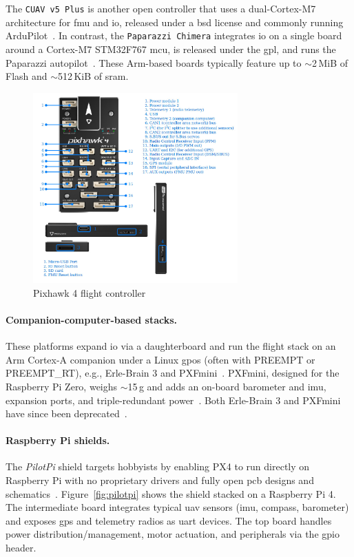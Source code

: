 The \lstinline|CUAV v5 Plus| is another open controller that uses a dual-Cortex-M7 architecture for \gls{fmu} and \gls{io}, released under a \gls{bsd} license and commonly running ArduPilot~\cite{arduPilot-cuavV5}. 
In contrast, the \lstinline|Paparazzi Chimera| integrates \gls{io} on a single board around a Cortex-M7 STM32F767 \gls{mcu}, is released under the \gls{gpl}, and runs the Paparazzi autopilot~\cite{paparazziChimera,paparazzi-github}. 
These Arm-based boards typically feature up to \(\sim\)2\,MiB of Flash and \(\sim\)512\,KiB of \gls{sram}.

\begin{figure}[!hbt]
  \centering
  \includegraphics[width=0.7\textwidth]{./img/jpg/osh-pixhawk4.jpg}
  \caption[Pixhawk 4 flight controller]{Pixhawk 4 flight controller~\cite{pixhawk4}\footnotemark}
  \label{fig:osh-pixhawk4}
\end{figure}

\paragraph{Companion-computer-based stacks.}
These platforms expand \gls{io} via a daughterboard and run the flight stack on an Arm Cortex-A companion under a Linux \gls{gpos} (often with PREEMPT or PREEMPT\_RT), e.g., Erle-Brain 3 and PXFmini~\cite{ebeidUAVPlatformsSurvey2017,erle-brain}. 
PXFmini, designed for the Raspberry Pi Zero, weighs \(\sim\)15\,g and adds an on-board barometer and \gls{imu}, expansion ports, and triple-redundant power~\cite{pxfmini}. 
Both Erle-Brain 3 and PXFmini have since been deprecated~\cite{pxfmini-deprec}.

\paragraph{Raspberry Pi shields.}
The \emph{PilotPi} shield targets hobbyists by enabling PX4 to run directly on Raspberry Pi with no proprietary drivers and fully open \gls{pcb} designs and schematics~\cite{px4-pilotpi}. 
Figure~\ref{fig:pilotpi} shows the shield stacked on a Raspberry Pi 4. 
The intermediate board integrates typical \gls{uav} sensors (\gls{imu}, compass, barometer) and exposes \gls{gps} and telemetry radios as \gls{uart} devices. 
The top board handles power distribution/management, motor actuation, and peripherals via the \gls{gpio} header.

